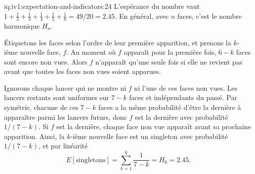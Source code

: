 \begin{solution}{iq:iv1:expectation-and-indicators:24}
L'espérance du nombre vaut $1 + \tfrac12 + \tfrac13 + \tfrac14 + \tfrac15 + \tfrac16 = 49/20 = 2.45$. En général, avec $n$ faces, c'est le nombre harmonique $H_n$.

Étiquetons les faces selon l'ordre de leur première apparition, et prenons la $k$-ième nouvelle face, $f$. Au moment où $f$ apparaît pour la première fois, $6 - k$ faces sont encore non vues. Alors $f$ n'apparaît qu'une seule fois si elle ne revient pas avant que toutes les faces non vues soient apparues.

Ignorons chaque lancer qui ne montre ni $f$ ni l'une de ces faces non vues. Les lancers restants sont uniformes sur $7 - k$ faces et indépendants du passé. Par symétrie, chacune de ces $7 - k$ faces a la même probabilité d'être la dernière à apparaître parmi les lancers futurs, donc $f$ est la dernière avec probabilité $1/(7-k)$. Si $f$ est la dernière, chaque face non vue apparaît avant sa prochaine apparition. Ainsi, la $k$-ième nouvelle face est un singleton avec probabilité $1/(7-k)$, et par linéarité
\[
E[\text{singletons}] = \sum_{k=1}^{6} \frac{1}{7-k} = H_6 = 2.45.
\]
\end{solution}

